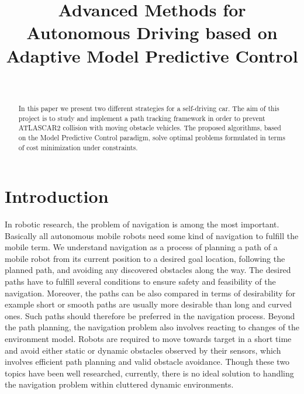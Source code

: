 \documentclass[conference, 11pt]{IEEEtran}
\title{Advanced Methods for Autonomous Driving based on Adaptive Model Predictive Control}
\author{\IEEEauthorblockN{Alberto Franco}\\
\IEEEauthorblockA{Department of Information Engineering\\
Università degli Studi di Padova\\ \href{mailto:alberto.franco.3@studenti.unipd.it}{alberto.franco.3@studenti.unipd.it}}}
\begin{document}
\maketitle
\begin{abstract}
	In this paper we present two different strategies for a self-driving car. The aim of this project is to study and implement a path tracking framework in order to prevent ATLASCAR2 collision with moving obstacle vehicles. The proposed algorithms, based on the Model Predictive Control paradigm, solve optimal problems formulated in terms of cost minimization under constraints.
\end{abstract}

\section{Introduction}
In robotic research, the problem of navigation is among the most important. Basically all autonomous mobile robots need some kind of navigation to fulfill the mobile term.
We understand navigation as a process of planning a path of a mobile robot from its current position to a desired goal location, following the planned path, and avoiding any discovered obstacles along the way. The desired paths have to
fulfill several conditions to ensure safety and feasibility of the navigation. Moreover, the paths can be also compared in terms of desirability for example short or smooth paths are usually more desirable than long and curved ones. Such paths should therefore be preferred in the navigation process. Beyond the path planning, the navigation problem also involves reacting to changes of the environment model. Robots are required to move towards target in a short time and avoid either static or dynamic obstacles observed by their sensors, which involves efficient path planning and valid obstacle avoidance. Though these two topics have been well researched, currently, there is no ideal solution to handling the navigation problem within cluttered dynamic environments.
\end{document}
